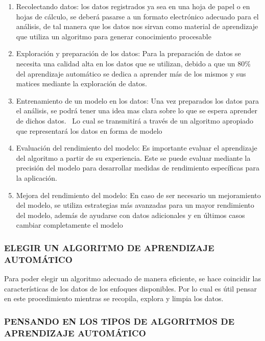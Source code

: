 \documentclass[
  letterpaper,
  DIV=11,
  numbers=noendperiod]{scrartcl}
\providecommand{\tightlist}{%
  \setlength{\itemsep}{0pt}\setlength{\parskip}{0pt}}\usepackage{longtable,booktabs,array}
\begin{document}
\begin{enumerate}
\def\labelenumi{\arabic{enumi}.}
\tightlist
\item
  Recolectando datos: los datos registrados ya sea en una hoja de papel
  o en hojas de cálculo, se deberá pasarse a un formato electrónico
  adecuado para el análisis, de tal manera que los datos nos sirvan como
  material de aprendizaje que utiliza un algoritmo para generar
  conocimiento procesable
\item
  Exploración y preparación de los datos: Para la preparación de datos
  se necesita una calidad alta en los datos que se utilizan, debido a
  que un 80\% del aprendizaje automático se dedica a aprender más de los
  mismos y sus matices mediante la exploración de datos.
\item
  Entrenamiento de un modelo en los datos: Una vez preparados los datos
  para el análisis, se podrá tener una idea mas clara sobre lo que se
  espera aprender de dichos datos.~ Lo cual se transmitirá a través de
  un algoritmo apropiado que representará los datos en forma de modelo
\item
  Evaluación del rendimiento del modelo: Es importante evaluar el
  aprendizaje del algoritmo a partir de su experiencia. Este se puede
  evaluar mediante la precisión del modelo para desarrollar medidas de
  rendimiento específicas para la aplicación.
\item
  Mejora del rendimiento del modelo: En caso de ser necesario un
  mejoramiento del modelo, se utiliza estrategias más avanzadas para un
  mayor rendimiento del modelo, además de ayudarse con datos adicionales
  y en últimos casos cambiar completamente el modelo
\end{enumerate}

\hypertarget{elegir-un-algoritmo-de-aprendizaje-automuxe1tico}{%
\subsubsection{\texorpdfstring{\textbf{ELEGIR UN ALGORITMO DE
APRENDIZAJE
AUTOMÁTICO}}{ELEGIR UN ALGORITMO DE APRENDIZAJE AUTOMÁTICO}}\label{elegir-un-algoritmo-de-aprendizaje-automuxe1tico}}

Para poder elegir un algoritmo adecuado de manera eficiente, se hace
coincidir las características de los datos de los enfoques disponibles.
Por lo cual es útil pensar en este procedimiento mientras se recopila,
explora y limpia los datos.

\hypertarget{pensando-en-los-tipos-de-algoritmos-de-aprendizaje-automuxe1tico}{%
\subsubsection{\texorpdfstring{\textbf{PENSANDO EN LOS TIPOS DE
ALGORITMOS DE APRENDIZAJE
AUTOMÁTICO}}{PENSANDO EN LOS TIPOS DE ALGORITMOS DE APRENDIZAJE AUTOMÁTICO}}\label{pensando-en-los-tipos-de-algoritmos-de-aprendizaje-automuxe1tico}}
\end{document}
